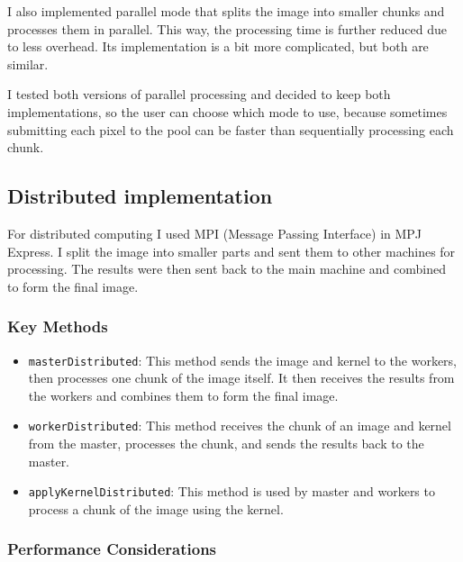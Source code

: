 \documentclass{article}
\begin{document}
\begin{multicols}{2}
    I also implemented parallel mode that splits the image into smaller chunks and processes them in parallel. This way, the processing time is further reduced due to less overhead. Its implementation is a bit more complicated, but both are similar.

    I tested both versions of parallel processing and decided to keep both implementations, so the user can choose which mode to use, because sometimes submitting each pixel to the pool can be faster than sequentially processing each chunk.

    \subsection{Distributed implementation}

    For distributed computing I used MPI (Message Passing Interface) in MPJ Express. I split the image into smaller parts and sent them to other machines for processing. The results were then sent back to the main machine and combined to form the final image.

    \subsubsection{Key Methods}

    \begin{itemize}
        \item \texttt{masterDistributed}: This method sends the image and kernel to the workers, then processes one chunk of the image itself. It then receives the results from the workers and combines them to form the final image.

        \item \texttt{workerDistributed}: This method receives the chunk of an image and kernel from the master, processes the chunk, and sends the results back to the master.

        \item \texttt{applyKernelDistributed}: This method is used by master and workers to process a chunk of the image using the kernel.

    \end{itemize}

    \subsubsection{Performance Considerations}


\end{multicols}
\end{document}
